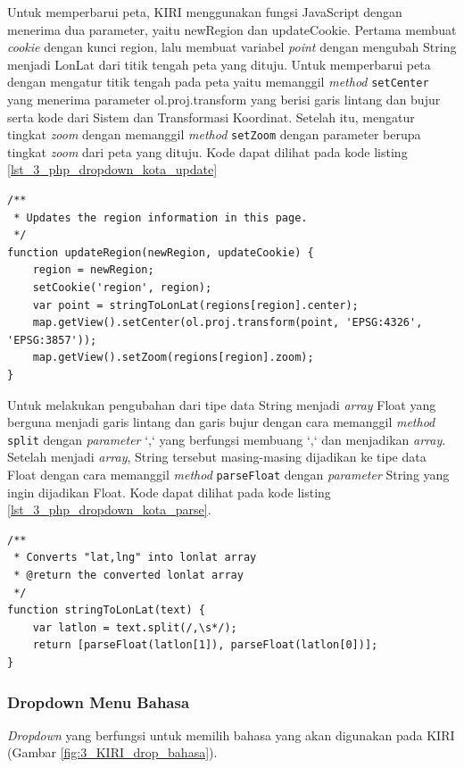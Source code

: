 Untuk memperbarui peta, KIRI menggunakan fungsi JavaScript dengan menerima dua parameter, yaitu newRegion dan updateCookie. Pertama membuat \textit{cookie} dengan kunci region, lalu membuat variabel \textit{point} dengan mengubah String menjadi LonLat dari titik tengah peta yang dituju. Untuk memperbarui peta dengan mengatur titik tengah pada peta yaitu memanggil \textit{method} \verb!setCenter! yang menerima parameter ol.proj.transform yang berisi garis lintang dan bujur serta kode dari Sistem  dan Transformasi  Koordinat. Setelah itu, mengatur tingkat \textit{zoom} dengan memanggil \textit{method} \verb!setZoom! dengan parameter berupa tingkat \textit{zoom} dari peta yang dituju. Kode dapat dilihat pada kode listing \ref{lst_3_php_dropdown_kota_update}

\begin{lstlisting}[caption=Fungsi JavaScript untuk memperbarui peta ,label = {lst_3_php_dropdown_kota_update}]
/**
 * Updates the region information in this page.
 */
function updateRegion(newRegion, updateCookie) {
	region = newRegion;
	setCookie('region', region);
	var point = stringToLonLat(regions[region].center);
	map.getView().setCenter(ol.proj.transform(point, 'EPSG:4326', 'EPSG:3857'));
	map.getView().setZoom(regions[region].zoom);
}
\end{lstlisting}

Untuk melakukan pengubahan dari tipe data String menjadi \textit{array} Float yang berguna menjadi garis lintang dan garis bujur dengan cara memanggil \textit{method} \verb!split! dengan \textit{parameter} `,` yang berfungsi membuang `,` dan menjadikan \textit{array}. Setelah menjadi \textit{array}, String tersebut masing-masing dijadikan ke tipe data Float dengan cara memanggil \textit{method} \verb!parseFloat! dengan \textit{parameter} String yang ingin dijadikan Float. Kode dapat dilihat pada kode listing \ref{lst_3_php_dropdown_kota_parse}.

\begin{lstlisting}[caption=Fungsi JavaScript untuk mengubah String menjadi \textit{array} Float ,label = {lst_3_php_dropdown_kota_parse}]
/**
 * Converts "lat,lng" into lonlat array
 * @return the converted lonlat array
 */
function stringToLonLat(text) {
	var latlon = text.split(/,\s*/);
	return [parseFloat(latlon[1]), parseFloat(latlon[0])];
}
\end{lstlisting}

\subsubsection{Dropdown Menu Bahasa}
\textit{Dropdown} yang berfungsi untuk memilih bahasa yang akan digunakan pada KIRI (Gambar \ref{fig:3_KIRI_drop_bahasa}).

